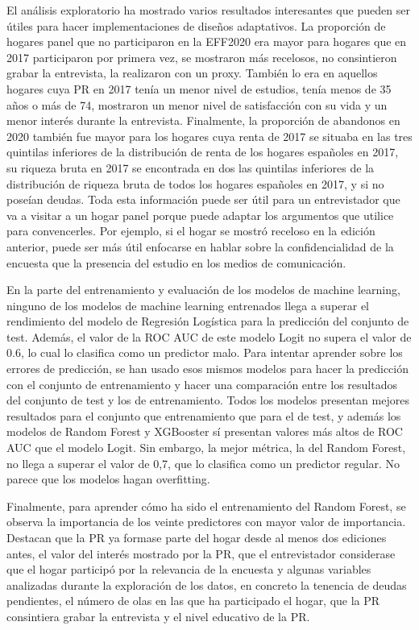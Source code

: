 El análisis exploratorio ha mostrado varios resultados interesantes que pueden ser útiles para hacer implementaciones de diseños adaptativos. La proporción de hogares panel que no participaron en la EFF2020 era mayor para hogares que en 2017 participaron por primera vez, se mostraron más recelosos, no consintieron grabar la entrevista, la realizaron con un proxy. También lo era en aquellos hogares cuya PR en 2017 tenía un menor nivel de estudios, tenía menos de 35 años o más de 74, mostraron un menor nivel de satisfacción con su vida y un menor interés durante la entrevista. Finalmente, la proporción de abandonos en 2020 también fue mayor para los hogares cuya renta de 2017 se situaba en las tres quintilas inferiores de la distribución de renta de los hogares españoles en 2017, su riqueza bruta en 2017 se encontrada en dos las quintilas inferiores de la distribución de riqueza bruta de todos los hogares españoles en 2017, y si no poseían deudas. Toda esta información puede ser útil para un entrevistador que va a visitar a un hogar panel porque puede adaptar los argumentos que utilice para convencerles. Por ejemplo, si el hogar se mostró receloso en la edición anterior, puede ser más útil enfocarse en hablar sobre la confidencialidad de la encuesta que la presencia del estudio en los medios de comunicación.

En la parte del entrenamiento y evaluación de los modelos de machine learning, ninguno de los modelos de machine learning entrenados llega a superar el rendimiento del modelo de Regresión Logística para la predicción del conjunto de test. Además, el valor de la ROC AUC de este modelo Logit no supera el valor de 0.6, lo cual lo clasifica como un predictor malo. Para intentar aprender sobre los errores de predicción, se han usado esos mismos modelos para hacer la predicción con el conjunto de entrenamiento y hacer una comparación entre los resultados del conjunto de test y los de entrenamiento. Todos los modelos presentan mejores resultados para el conjunto que entrenamiento que para el de test, y además los modelos de Random Forest y XGBooster sí presentan valores más altos de ROC AUC que el modelo Logit. Sin embargo, la mejor métrica, la del Random Forest, no llega a superar el valor de 0,7, que lo clasifica como un predictor regular. No parece que los modelos hagan overfitting.

Finalmente, para aprender cómo ha sido el entrenamiento del Random Forest, se observa la importancia de los veinte predictores con mayor valor de importancia. Destacan que la PR ya formase parte del hogar desde al menos dos ediciones antes, el valor del interés mostrado por la PR, que el entrevistador considerase que el hogar participó por la relevancia de la encuesta y algunas variables analizadas durante la exploración de los datos, en concreto la tenencia de deudas pendientes, el número de olas en las que ha participado el hogar, que la PR consintiera grabar la entrevista y el nivel educativo de la PR.

